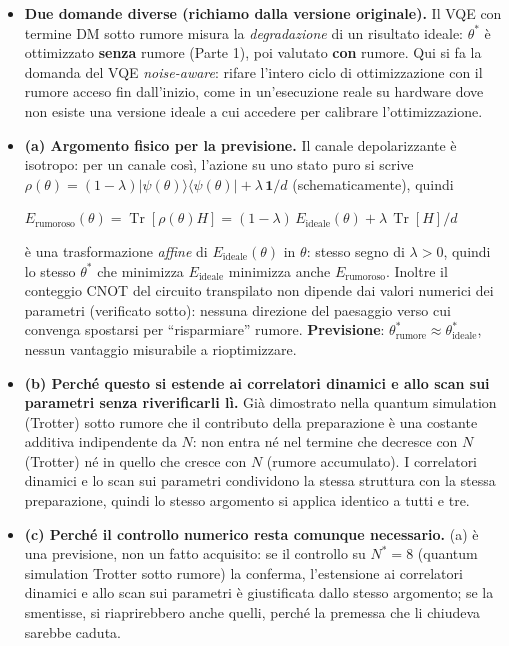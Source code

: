 \documentclass[11pt,a4paper]{article}
\newcommand{\Tr}{\operatorname{Tr}}
\newcommand{\ket}[1]{\lvert #1 \rangle}
\newcommand{\bra}[1]{\langle #1 \rvert}
\begin{document}
\begin{itemize}[leftmargin=1.3em,itemsep=0.35em]
\item \textbf{Due domande diverse (richiamo dalla versione originale).}
Il VQE con termine DM sotto rumore misura la \emph{degradazione} di un risultato ideale: $\theta^*$ è
ottimizzato \textbf{senza} rumore (Parte 1), poi valutato \textbf{con}
rumore. Qui si fa la domanda del VQE \emph{noise-aware}: rifare l'intero
ciclo di ottimizzazione con il rumore acceso fin dall'inizio, come in
un'esecuzione reale su hardware dove non esiste una versione ideale a cui
accedere per calibrare l'ottimizzazione.

\item \textbf{(a) Argomento fisico per la previsione.} Il canale
depolarizzante è isotropo: per un canale così, l'azione su uno stato puro
si scrive $\rho(\theta)=(1-\lambda)\ket{\psi(\theta)}\bra{\psi(\theta)}+\lambda\,\mathbf{1}/d$
(schematicamente), quindi
\begin{keyeq}
\centering
$E_\text{rumoroso}(\theta)=\Tr[\rho(\theta)H] = (1-\lambda)\,E_\text{ideale}(\theta) + \lambda\,\Tr[H]/d$
\end{keyeq}
è una trasformazione \emph{affine} di $E_\text{ideale}(\theta)$ in
$\theta$: stesso segno di $\lambda>0$, quindi lo stesso $\theta^*$ che
minimizza $E_\text{ideale}$ minimizza anche $E_\text{rumoroso}$. Inoltre
il conteggio CNOT del circuito transpilato non dipende dai valori
numerici dei parametri (verificato sotto): nessuna direzione del
paesaggio verso cui convenga spostarsi per ``risparmiare'' rumore.
\textbf{Previsione}: $\theta^*_\text{rumore}\approx\theta^*_\text{ideale}$,
nessun vantaggio misurabile a rioptimizzare.

\item \textbf{(b) Perché questo si estende ai correlatori dinamici e allo
scan sui parametri senza riverificarli lì.} Già dimostrato nella
quantum simulation (Trotter) sotto rumore che il contributo della
preparazione è una costante additiva indipendente da $N$: non entra né
nel termine che decresce con $N$ (Trotter) né in quello che cresce con $N$
(rumore accumulato). I correlatori dinamici e lo scan sui parametri
condividono la stessa struttura con la
stessa preparazione, quindi lo stesso argomento si applica identico a
tutti e tre.

\item \textbf{(c) Perché il controllo numerico resta comunque
necessario.} (a) è una previsione, non un fatto acquisito: se il
controllo su $N^*=8$ (quantum simulation Trotter sotto rumore) la
conferma, l'estensione ai correlatori dinamici e allo scan sui parametri è
giustificata dallo stesso argomento; se la smentisse, si riaprirebbero
anche quelli, perché la premessa che li chiudeva sarebbe caduta.


\end{itemize}
\end{document}
